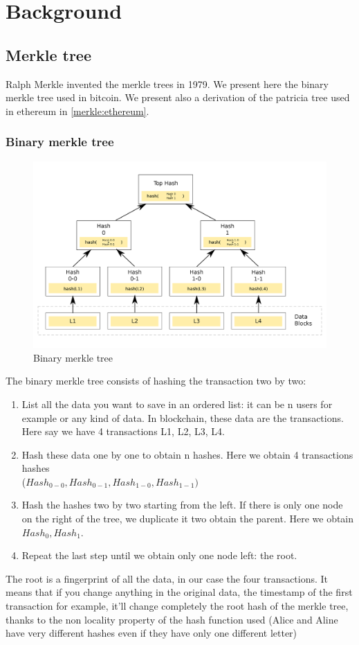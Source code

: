 \chapter{Background}
\section{Merkle tree \cite{merkle1988digital}}
Ralph Merkle invented the merkle trees in 1979. We present here the binary merkle tree used in bitcoin. We present also a derivation of the patricia tree used in ethereum in \ref{merkle:ethereum}.
\subsection{Binary merkle tree}
\begin{figure}[H]
    \centering
\includegraphics[width=0.7\linewidth]{background/merkle.png}
    \caption{Binary merkle tree}
    \label{fig:merkle}
\end{figure}
The binary merkle tree consists of hashing the transaction two by two: 
\begin{enumerate}
    \item List all the data you want to save in an ordered list: it can be n users for example or any kind of data. In blockchain, these data are the transactions. Here say we have 4 transactions L1, L2, L3, L4.
    \item Hash these data one by one to obtain n hashes. Here we obtain 4 transactions hashes \\($Hash_{0-0},Hash_{0-1},Hash_{1-0},Hash_{1-1})$
    \item Hash the hashes two by two starting from the left. If there is only one node on the right of the tree, we duplicate it two obtain the parent. Here we obtain $Hash_0, Hash_1$.
    \item Repeat the last step until we obtain only one node left: the root.
\end{enumerate}
The root is a fingerprint of all the data, in our case the four transactions. 
It means that if you change anything in the original data, the timestamp of the first transaction for example, it'll change completely the root hash of the merkle tree, thanks to the non locality property of the hash function used (Alice and Aline have very different hashes even if they have only one different letter)

